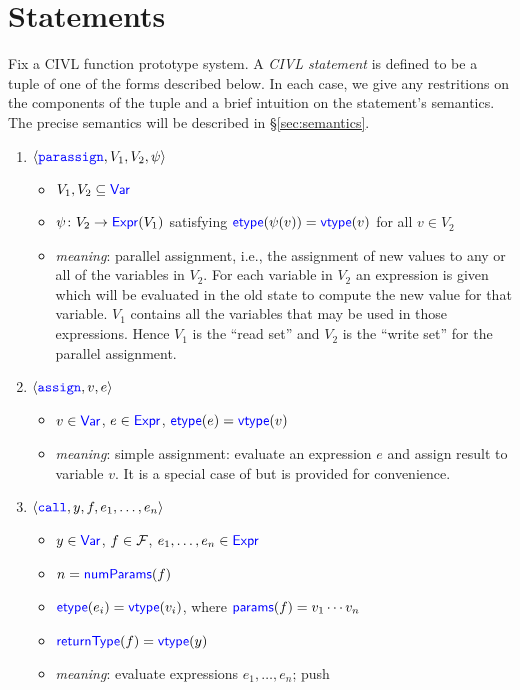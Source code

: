 \documentclass[11pt, oneside, letterpaper]{book}
\begin{document}
\section{Statements}

Fix a CIVL function prototype system.  A \emph{CIVL statement} is
defined to be a tuple of one of the forms described below.
In each case, we give any restritions on the components of the tuple
and a brief intuition on the statement's semantics.  The precise
semantics will be described in \S\ref{sec:semantics}.

\begin{enumerate}
\item $\langle\texttt{\textcolor{blue}{parassign}},V_1,V_2,\psi\rangle$
  \begin{itemize}
  \item $V_1,V_2\subseteq\textsf{\textcolor{blue}{\textup{Var}}}$
  \item $\psi\colon V_2\rightarrow\textsf{\textcolor{blue}{\textup{Expr}}}(V_1)$ satisfying
    $\textsf{\textcolor{blue}{\textup{etype}}}(\psi(v))=\textsf{\textcolor{blue}{\textup{vtype}}}(v)$ for all $v\in V_2$
  \item \emph{meaning}: parallel assignment, i.e., the assignment of new
    values to any or all of the variables in $V_2$. For each variable
    in $V_2$ an expression is given which will be evaluated in the old
    state to compute the new value for that variable.  $V_1$ contains
    all the variables that may be used in those expressions.  Hence
    $V_1$ is the ``read set'' and $V_2$ is the ``write set'' for the
    parallel assignment.
  \end{itemize}
\item $\langle\texttt{\textcolor{blue}{assign}},v,e\rangle$
  \begin{itemize}
  \item $v\in\textsf{\textcolor{blue}{\textup{Var}}}$, $e\in\textsf{\textcolor{blue}{\textup{Expr}}}$, $\textsf{\textcolor{blue}{\textup{etype}}}(e)=\textsf{\textcolor{blue}{\textup{vtype}}}(v)$
  \item \emph{meaning}: simple assignment: evaluate an expression $e$ and
    assign result to variable $v$.  It is a special case of
     but is provided for convenience.
  \end{itemize}
\item $\langle\texttt{\textcolor{blue}{call}},y,f,e_1,\ldots,e_n\rangle$
  \begin{itemize}
  \item $y\in\textsf{\textcolor{blue}{\textup{Var}}}$, $f\in\mathcal{F}$, $e_1,\ldots,e_n\in\textsf{\textcolor{blue}{\textup{Expr}}}$
  \item $n=\textsf{\textcolor{blue}{\textup{numParams}}}(f)$
  \item $\textsf{\textcolor{blue}{\textup{etype}}}(e_i)=\textsf{\textcolor{blue}{\textup{vtype}}}(v_i)$, where $\textsf{\textcolor{blue}{\textup{params}}}(f)=v_1\cdots v_n$
  \item $\textsf{\textcolor{blue}{\textup{returnType}}}(f)=\textsf{\textcolor{blue}{\textup{vtype}}}(y)$
  \item \emph{meaning}: evaluate expressions $e_1,\ldots,e_n$; push

\end{itemize}
\end{enumerate}
\end{document}
